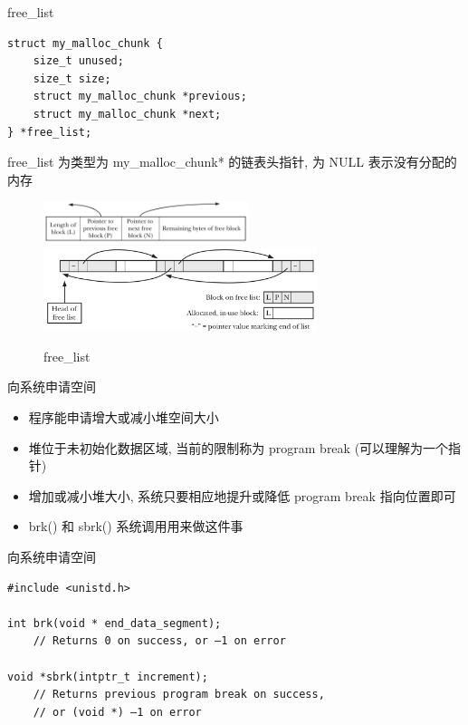\begin{frame}[fragile]{free\_list}
    \scriptsize\begin{verbatim}
struct my_malloc_chunk {
    size_t unused;
    size_t size;
    struct my_malloc_chunk *previous;
    struct my_malloc_chunk *next;
} *free_list;
    \end{verbatim}
    free\_list 为类型为 my\_malloc\_chunk* 的链表头指针, 为 NULL 表示没有分配的内存
    \begin{figure}[ht!]
        \centering
        \includegraphics[width=60mm]{figs/my_malloc_chunk.png}
        \includegraphics[width=80mm]{figs/free_list.png}
        \caption{free\_list}
    \end{figure}
\end{frame}

\begin{frame}[fragile]{向系统申请空间}
    \begin{itemize}[<+- | alert@+>]
        \item 程序能申请增大或减小堆空间大小
        \item 堆位于未初始化数据区域, 当前的限制称为 program break (可以理解为一个指针)
        \item 增加或减小堆大小, 系统只要相应地提升或降低 program break 指向位置即可
        \item brk() 和 sbrk() 系统调用用来做这件事
    \end{itemize}
\end{frame}

\begin{frame}[fragile]{向系统申请空间}
    \small\begin{verbatim}
#include <unistd.h>

int brk(void * end_data_segment);
    // Returns 0 on success, or –1 on error

void *sbrk(intptr_t increment);
    // Returns previous program break on success,
    // or (void *) –1 on error
    \end{verbatim}
\end{frame}

